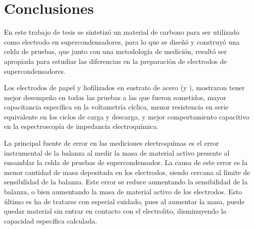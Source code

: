 \chapter{Conclusiones}
En este trabajo de tesis se sintetizó un material de carbono para ser utilizado como electrodo en supercondensadores, para lo que se diseñó y construyó una celda de pruebas, que junto con una metodología de medición, resultó ser apropiada para estudiar las diferencias en la preparación de electrodos de supercondensadores.

Los electrodos de papel y liofilizados en sustrato de acero (\mPapelAcero y \mLiofilizadoAcero), mostraron tener mejor desempeño en todas las pruebas a las que fueron sometidos, mayor capacitancia específica en la voltametría cíclica, menor resistencia en serie equivalente en los ciclos de carga y descarga, y mejor comportamiento capacitivo en la espectroscopía de impedancia electroquímica.

La principal fuente de error en las mediciones electroquímas es el error instrumental de la balanza al medir la masa de material activo presente al ensamblar la celda de pruebas de supercondensador. La causa de este error es la menor cantidad de masa depositada en los electrodos, siendo cercana al límite de sensibilidad de la balanza. Este error se reduce aumentando la sensibilidad de la balanza, o bien aumentando la masa de material activo de los electrodos. Esto último es ha de tratarse con especial cuidado, pues al aumentar la masa, puede quedar material sin entrar en contacto con el electrolito, disminuyendo la capacidad específica calculada. 